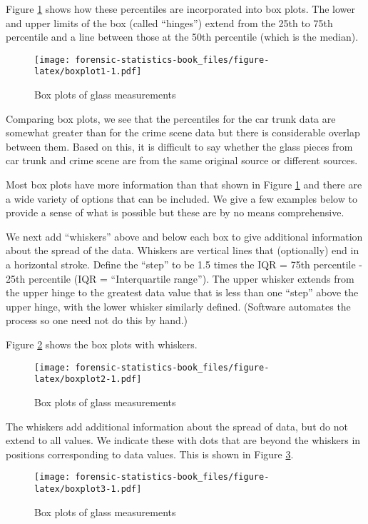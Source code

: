 \documentclass[
]{book}
\begin{document}
Figure \ref{fig:boxplot1} shows how these percentiles
are incorporated into box plots. The lower and upper
limits of the box (called ``hinges'') extend from the
25th to 75th percentile and a line between those at the 50th percentile
(which is the median).

\begin{figure}
\centering
\texttt{[image: forensic-statistics-book\_files/figure-latex/boxplot1-1.pdf]}
\caption{\label{fig:boxplot1}Box plots of glass measurements}
\end{figure}

Comparing box plots, we see that the percentiles for the car trunk data
are somewhat greater than for the crime scene data but there is considerable
overlap between them. Based on this, it is difficult to say whether the
glass pieces from car trunk and crime scene are from the same
original source or different sources.

Most box plots have more information than that shown in Figure \ref{fig:boxplot1}
and there are a wide variety of options that can be included. We give a few
examples below to provide a sense of what is possible but these are by no means
comprehensive.

We next add ``whiskers'' above and below each box to give additional information
about the spread of the data. Whiskers are vertical lines that (optionally)
end in a horizontal stroke. Define the ``step'' to be 1.5 times the
IQR = 75th percentile - 25th percentile (IQR = ``Interquartile range'').
The upper whisker extends
from the upper hinge to the greatest data value that is less than one ``step''
above the upper hinge, with the lower whisker similarly defined. (Software
automates the process so one need not do this by hand.)

Figure \ref{fig:boxplot2} shows the box plots with whiskers.

\begin{figure}
\centering
\texttt{[image: forensic-statistics-book\_files/figure-latex/boxplot2-1.pdf]}
\caption{\label{fig:boxplot2}Box plots of glass measurements}
\end{figure}

The whiskers add additional information about the spread of data, but do
not extend to all values. We indicate these with dots that are beyond
the whiskers in positions corresponding to data values. This is shown in
Figure \ref{fig:boxplot3}.

\begin{figure}
\centering
\texttt{[image: forensic-statistics-book\_files/figure-latex/boxplot3-1.pdf]}
\caption{\label{fig:boxplot3}Box plots of glass measurements}
\end{figure}
\end{document}
